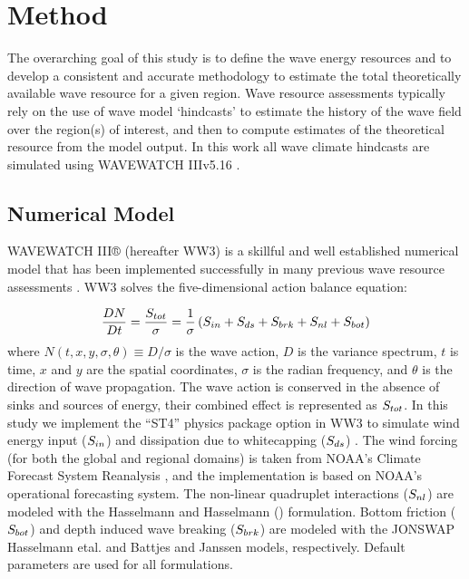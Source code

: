 \section{Method} \label{sec:method}
The overarching goal of this study is to define the wave energy resources and to develop a consistent and accurate methodology to estimate the total theoretically available wave resource for a given region. 
Wave resource assessments typically rely on the use of wave model `hindcasts' to estimate the history of the wave field over the region(s) of interest, and then to compute estimates of the theoretical resource from the model output. 
In this work all wave climate hindcasts are simulated using WAVEWATCH III\textregistered v5.16 \citep{tolmanDistributedmemoryConceptsWave2002}.

\subsection{Numerical Model} \label{sec:method:model}
WAVEWATCH III® (hereafter WW3) is a skillful and well established numerical model that has been implemented successfully in many previous wave resource assessments \citep[e.g.,][]{garcia-medinaWaveResourceAssessment2014,yangWaveModelTest2017}.
WW3 solves the five-dimensional action balance equation:

\begin{align}
  \frac{DN}{Dt} = \frac{S_{ tot }}{\sigma} = \frac{1}{\sigma}\left ( S_{ in } + S_{ ds } + S_{ brk } + S_{ nl } + S_{ bot } \right )
\end{align}
where $N(t,x,y,\sigma,\theta) \equiv D/\sigma$ is the wave action, $D$ is the variance spectrum, $t$ is time, $x$ and $y$ are the spatial coordinates, $\sigma$ is the radian frequency, and $\theta$ is the direction of wave propagation.
The wave action is conserved in the absence of sinks and sources of energy, their combined effect is represented as $S_{ tot }$. In this study we implement the ``ST4'' physics package option in WW3 to simulate wind energy input ($S_{ in }$) and dissipation due to whitecapping ($S_{ ds }$) \citep{ardhuinObservationSwellDissipation2009}.
The wind forcing (for both the global and regional domains) is taken from NOAA's Climate Forecast System Reanalysis \citep{sahaNCEPClimateForecast2010}, and the implementation is based on NOAA's operational forecasting system.
The non-linear quadruplet interactions ($S_{ nl }$) are modeled with the Hasselmann and Hasselmann (\citeyear{hasselmannComputationsParameterizationsNonlinear1985}) formulation.
Bottom friction ($S_{ bot }$) and depth induced wave breaking ($S_{ brk }$) are modeled with the JONSWAP Hasselmann etal. \citeyear{hasselmannMeasurementsWindwaveGrowth1973} and Battjes and Janssen \citeyear{battjesEnergyLossSetup1978} models, respectively.
Default parameters are used for all formulations. 


